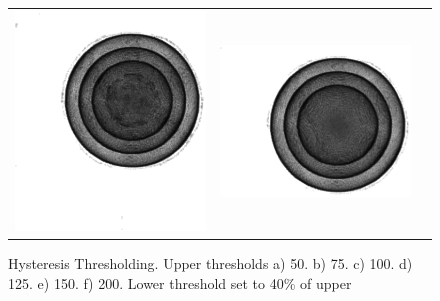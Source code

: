\documentclass[9pt]{beamer}
\begin{document}
\begin{frame}
\begin{figure}
\begin{tabular}{c c c }
													\includegraphics[scale=0.2]{Threshold150}&
													\includegraphics[scale=0.2]{Threshold200}
						\end{tabular}
\caption{Hysteresis Thresholding. Upper thresholds a) 50. b) 75. c) 100. d) 125. e) 150. f) 200. Lower threshold set to 40\% of upper}
					\end{figure}
			

	\end{frame}
\end{document}
